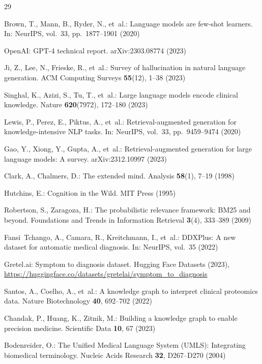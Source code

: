 \documentclass[runningheads]{llncs}
\begin{document}
\begin{thebibliography}{29}

Brown, T., Mann, B., Ryder, N., et~al.: Language models are few-shot learners. In: NeurIPS, vol.~33, pp.~1877--1901 (2020)

OpenAI: GPT-4 technical report. arXiv:2303.08774 (2023)

Ji, Z., Lee, N., Frieske, R., et~al.: Survey of hallucination in natural language generation. ACM Computing Surveys \textbf{55}(12), 1--38 (2023)

Singhal, K., Azizi, S., Tu, T., et~al.: Large language models encode clinical knowledge. Nature \textbf{620}(7972), 172--180 (2023)

Lewis, P., Perez, E., Piktus, A., et~al.: Retrieval-augmented generation for knowledge-intensive NLP tasks. In: NeurIPS, vol.~33, pp.~9459--9474 (2020)

Gao, Y., Xiong, Y., Gupta, A., et~al.: Retrieval-augmented generation for large language models: A survey. arXiv:2312.10997 (2023)

Clark, A., Chalmers, D.: The extended mind. Analysis \textbf{58}(1), 7--19 (1998)

Hutchins, E.: Cognition in the Wild. MIT Press (1995)

Robertson, S., Zaragoza, H.: The probabilistic relevance framework: BM25 and beyond. Foundations and Trends in Information Retrieval \textbf{3}(4), 333--389 (2009)

Fansi~Tchango, A., Camara, R., Kreitchmann, I., et~al.: DDXPlus: A new dataset for automatic medical diagnosis. In: NeurIPS, vol.~35 (2022)

Gretel.ai: Symptom to diagnosis dataset. Hugging Face Datasets (2023), \url{https://huggingface.co/datasets/gretelai/symptom_to_diagnosis}

Santos, A., Coelho, A., et~al.: A knowledge graph to interpret clinical proteomics data. Nature Biotechnology \textbf{40}, 692--702 (2022)

Chandak, P., Huang, K., Zitnik, M.: Building a knowledge graph to enable precision medicine. Scientific Data \textbf{10}, 67 (2023)

Bodenreider, O.: The Unified Medical Language System (UMLS): Integrating biomedical terminology. Nucleic Acids Research \textbf{32}, D267--D270 (2004)


\end{thebibliography}
\end{document}
